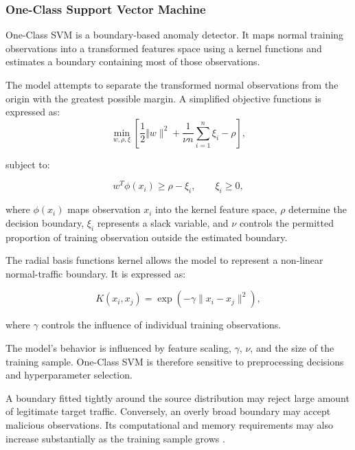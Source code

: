 \subsubsection{One-Class Support Vector Machine }
\label{subsec:one-class-svm}

One-Class SVM is a boundary-based anomaly detector. It maps normal training observations into a transformed features space using a kernel functions and estimates a boundary containing most of those observations.

The model attempts to separate the transformed normal observations from the origin with the greatest possible margin. A simplified objective functions is expressed as: 
\begin{equation}
       \min_{w, \rho, \xi}
       \left[
            \frac{1}{2}\Vert w\rVert^2
            +
            \frac{1}{\nu n}
            \sum_{i=1}^{n}\xi_i
            -
            \rho
       \right],
       \label{eq:ocsvm-objective}
\end{equation}

subject to:

\begin{equation}
       w^{T}\phi(x_i) \geq \rho-\xi_i,
       \qquad
       \xi_i \geq 0,
       \label{eq:ocsvm-constraints}
\end{equation}


where \(\phi(x_i)\) maps observation \(x_i\) into the kernel feature space, \(\rho\) determine the decision boundary, \(\xi_i\) represents a slack variable,  and \(\nu\) controls the permitted proportion of training observation outside the estimated boundary.

The radial basis functions kernel allows the model to represent a non-linear normal-traffic boundary. It is expressed as:

\begin{equation}
       K(x_i, x_j) =
       \exp\left(
               -\gamma\lVert x_i-x_j\rVert^2
        \right),
        \label{eq:rbf-kernel}
\end{equation}

where \(\gamma\) controls the influence of individual training observations.

The model's behavior is influenced by feature scaling, \(\gamma\), \(\nu\),  and the size of the training sample. One-Class SVM is therefore sensitive to preprocessing decisions and hyperparameter selection.

A boundary fitted tightly around the source distribution may reject large amount of legitimate target traffic. Conversely, an overly broad boundary may accept malicious observations. Its computational and memory requirements may also increase substantially as the training sample grows \cite{Verkerken2022,Khraisat2019}.


